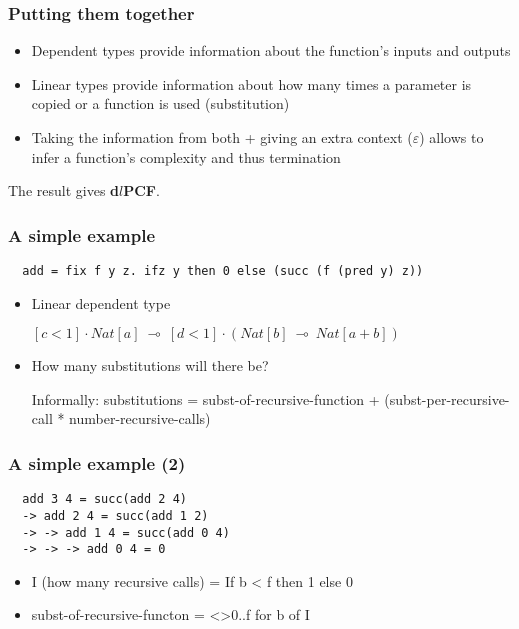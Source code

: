 \documentclass{beamer}
\begin{document}
\begin{frame}[fragile]
  \frametitle{Putting them together}
  \begin{itemize}
  \item Dependent types provide information about the function's inputs and outputs

  \item Linear types provide information about how many times a parameter is
    copied or a function is used (substitution)

  \item Taking the information from both + giving an extra context
    ($\varepsilon$) allows to infer a function's complexity and thus termination
  \end{itemize}

  \medskip

  The result gives \textbf{d$l$PCF}.
\end{frame}

\begin{frame}[fragile]
  \frametitle{A simple example}
\begin{verbatim}
  add = fix f y z. ifz y then 0 else (succ (f (pred y) z))
\end{verbatim}
\begin{itemize}
\item Linear dependent type 

  $ [c < 1] \cdot Nat[a] ~\multimap~[d < 1] \cdot (Nat[b]~\multimap~Nat[a + b])$

\item  How many substitutions will there be? 

  Informally: substitutions = subst-of-recursive-function +
  (subst-per-recursive-call * number-recursive-calls)

\end{itemize}
\end{frame}

\begin{frame}[fragile]
  \frametitle{A simple example (2)}

\begin{verbatim}
  add 3 4 = succ(add 2 4)
  -> add 2 4 = succ(add 1 2)
  -> -> add 1 4 = succ(add 0 4)
  -> -> -> add 0 4 = 0
\end{verbatim}
\begin{itemize}
\item I (how many recursive calls) = If b < f then 1 else 0
\item subst-of-recursive-functon = <>0..f for b of I
\end{itemize}
\end{frame}
\end{document}
